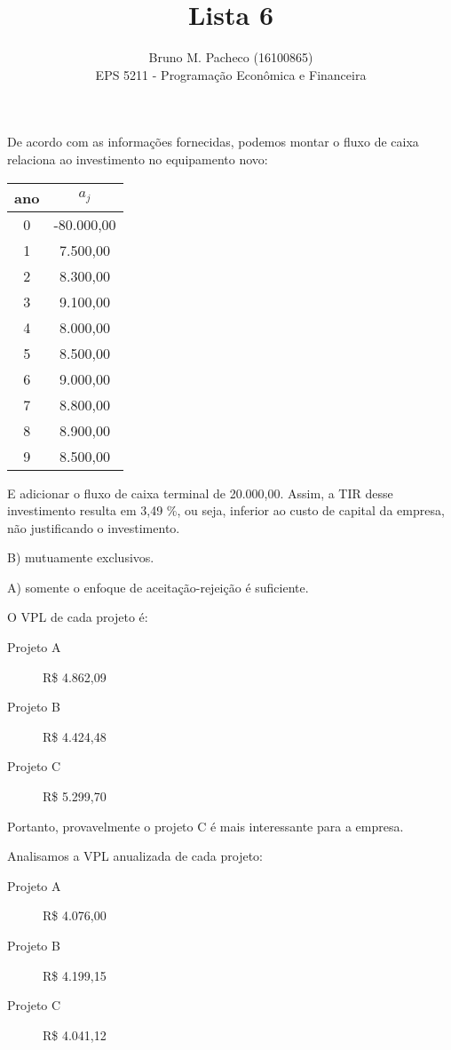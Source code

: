 \documentclass[a4paper]{report}
\begin{document}
 
\title{Lista 6}
\author{Bruno M. Pacheco (16100865)\\
EPS 5211 - Programação Econômica e Financeira}
 
\maketitle
 

De acordo com as informações fornecidas, podemos montar o fluxo de caixa relaciona ao investimento no equipamento novo:
\begin{table}[H]
    \centering
    \label{tab:label}
    \begin{tabular}{c | c}
	ano & $a_j$ \\
	\hline
	0 & -80.000,00 \\
	1 & 7.500,00 \\
	2 & 8.300,00 \\
	3 & 9.100,00 \\
	4 & 8.000,00 \\
	5 & 8.500,00 \\
	6 & 9.000,00 \\
	7 & 8.800,00 \\
	8 & 8.900,00 \\
	9 & 8.500,00
    \end{tabular}
\end{table}
E adicionar o fluxo de caixa terminal de 20.000,00. Assim, a TIR desse investimento resulta em 3,49 \%, ou seja, inferior ao custo de capital da empresa, não justificando o investimento.


B) mutuamente exclusivos.


A) somente o enfoque de aceitação-rejeição é suficiente.


O VPL de cada projeto é:
\begin{description}
    \item[Projeto A] R\$ 4.862,09
    \item[Projeto B] R\$ 4.424,48
    \item[Projeto C] R\$ 5.299,70
\end{description}

Portanto, provavelmente o projeto C é mais interessante para a empresa.


Analisamos a VPL anualizada de cada projeto:
\begin{description}
    \item[Projeto A] R\$ 4.076,00
    \item[Projeto B] R\$ 4.199,15
    \item[Projeto C] R\$ 4.041,12
\end{description}
\end{document}
